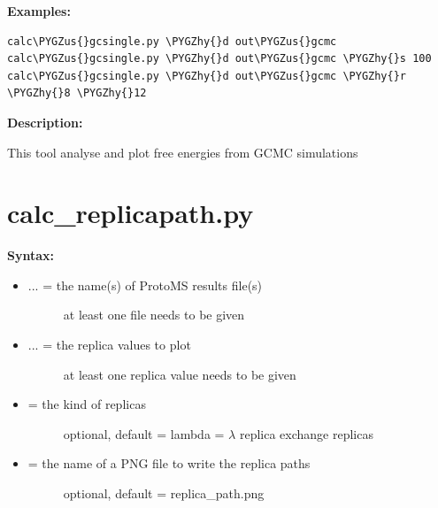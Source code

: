 \documentclass[letterpaper,10pt,english]{sphinxmanual}
\def\PYGZus{\char`\_}
\def\PYGZhy{\char`\-}
\begin{document}
\textbf{Examples:}

\begin{Verbatim}[commandchars=\\\{\}]
calc\PYGZus{}gcsingle.py \PYGZhy{}d out\PYGZus{}gcmc
calc\PYGZus{}gcsingle.py \PYGZhy{}d out\PYGZus{}gcmc \PYGZhy{}s 100
calc\PYGZus{}gcsingle.py \PYGZhy{}d out\PYGZus{}gcmc \PYGZhy{}r \PYGZhy{}8 \PYGZhy{}12
\end{Verbatim}

\textbf{Description:}

This tool analyse and plot free energies from GCMC simulations


\section{calc\_replicapath.py}
\label{tools:calc-replicapath-py}
\textbf{Syntax:}

\begin{itemize}
\item {} \begin{description}
\item[{ ... = the name(s) of ProtoMS results file(s)}] \leavevmode
at least one file needs to be given

\end{description}

\item {} \begin{description}
\item[{ ... = the replica values to plot}] \leavevmode
at least one replica value needs to be given

\end{description}

\item {} \begin{description}
\item[{ = the kind of replicas}] \leavevmode
optional, default = lambda
 = \(\lambda\) replica exchange replicas

\end{description}

\item {} \begin{description}
\item[{ = the name of a PNG file to write the replica paths}] \leavevmode
optional, default = replica\_path.png

\end{description}

\end{itemize}
\end{document}
